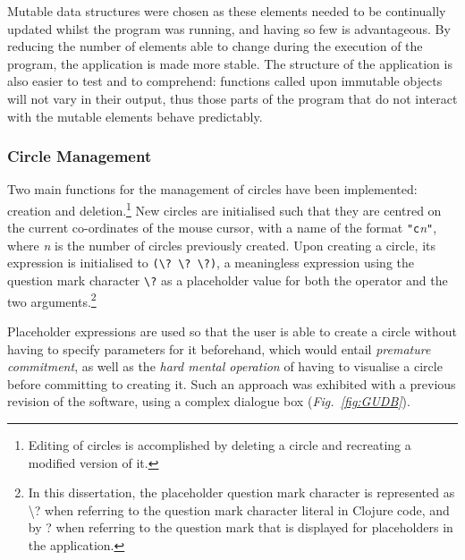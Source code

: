 \documentclass[12pt,twoside,notitlepage,xetex]{report}
\begin{document}
Mutable data structures were chosen as these elements needed to be continually updated whilst the program was running, and having so few is advantageous.  By reducing the number of elements able to change during the execution of the program, the application is made more stable.  The structure of the application is also easier to test and to comprehend: functions called upon immutable objects will not vary in their output, thus those parts of the program that do not interact with the mutable elements behave predictably.

%
\subsubsection{Circle Management}

Two main functions for the management of circles have been implemented: creation and deletion.\footnote{Editing of circles is accomplished by deleting a circle and recreating a modified version of it.}  New circles are initialised such that they are centred on the current co-ordinates of the mouse cursor, with a name of the format \verb¬"c¬\emph{n}\verb¬"¬, where \emph{n} is the number of circles previously created.  Upon creating a circle, its expression is initialised to \verb¬(\? \? \?)¬, a meaningless expression using the question mark character \verb¬\?¬ as a placeholder value for both the operator and the two arguments.\footnote{In this dissertation, the placeholder question mark character is represented as {\ttfamily \textbackslash?} when referring to the question mark character literal in Clojure code, and by {\sfapp ?} when referring to the question mark that is displayed for placeholders in the application.}

Placeholder expressions are used so that the user is able to create a circle without having to specify parameters for it beforehand, which would entail \emph{premature commitment}, as well as the \emph{hard mental operation} of having to visualise a circle before committing to creating it.  Such an approach was exhibited with a previous revision of the software, using a complex dialogue box (\emph{Fig.~\ref{fig:GUDB}}).
\end{document}

